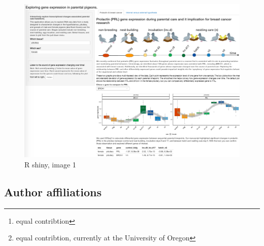 \newpage

\begin{figure}[ht]
  \centering
  \includegraphics[width=1.0\textwidth]{../../figures/supplfig3}
  \caption{R shiny, image 1}
  \label{figure:supplfig3}
\end{figure}

\newpage

\hypertarget{author-affiliations}{%
\subsection{Author affiliations}\label{author-affiliations}}


\address{%
Rayna M Harris \footnote{equal contribtion}\\
University of California, Davis\\
\\
}


\address{%
Suzanne H. Austin \footnote{equal contribtion, currently at the
  University of Oregon}\\
University of California, Davis\\
\\
}


\address{%
Andrew S. Lang\\
University of New Hampshire\\
\\
}


\address{%
Victoria S. Farrar\\
University of California, Davis\\
\\
}


\address{%
April Booth\\
University of California, Davis\\
\\
}


